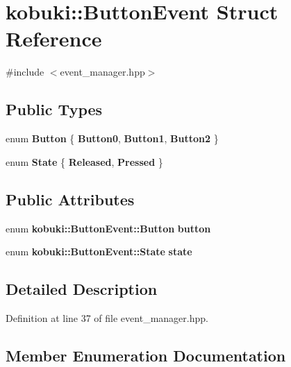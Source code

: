 \section{kobuki\-:\-:\-Button\-Event \-Struct \-Reference}
\label{structkobuki_1_1ButtonEvent}


{\ttfamily \#include $<$event\-\_\-manager.\-hpp$>$}

\subsection*{\-Public \-Types}
\begin{DoxyCompactItemize}
\item 
enum {\bf \-Button} \{ {\bf \-Button0}, 
{\bf \-Button1}, 
{\bf \-Button2}
 \}
\item 
enum {\bf \-State} \{ {\bf \-Released}, 
{\bf \-Pressed}
 \}
\end{DoxyCompactItemize}
\subsection*{\-Public \-Attributes}
\begin{DoxyCompactItemize}
\item 
enum {\bf kobuki\-::\-Button\-Event\-::\-Button} {\bf button}
\item 
enum {\bf kobuki\-::\-Button\-Event\-::\-State} {\bf state}
\end{DoxyCompactItemize}


\subsection{\-Detailed \-Description}


\-Definition at line 37 of file event\-\_\-manager.\-hpp.



\subsection{\-Member \-Enumeration \-Documentation}
